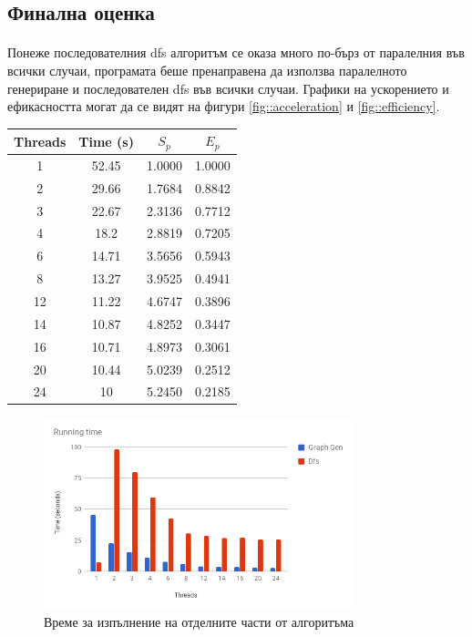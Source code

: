 \subsection*{Финална оценка}

\paragraph*{} Понеже последователния dfs алгоритъм се оказа много по-бърз от паралелния във всички случаи, програмата беше пренаправена да използва паралелното генериране и последователен dfs във всички случаи. Графики на ускорението и ефикасността могат да се видят на фигури \ref{fig::acceleration} и \ref{fig::efficiency}.

\begin{tabular}{|c|c|c|c|}
\hline
Threads & Time (s) & $S_p$ & $E_p$\\
\hline \hline
1 & 52.45 & 1.0000 & 1.0000 \\
\hline
2 & 29.66 & 1.7684 & 0.8842 \\
\hline
3 & 22.67 & 2.3136 & 0.7712 \\
\hline
4 & 18.2 & 2.8819 & 0.7205 \\
\hline
6 & 14.71 & 3.5656 & 0.5943 \\
\hline
8 & 13.27 & 3.9525 & 0.4941 \\
\hline
12 & 11.22 & 4.6747 & 0.3896 \\
\hline
14 & 10.87 & 4.8252 & 0.3447 \\
\hline
16 & 10.71 & 4.8973 & 0.3061 \\
\hline
20 & 10.44 & 5.0239 & 0.2512 \\
\hline
24 & 10 & 5.2450 & 0.2185 \\
\hline
\end{tabular}

\begin{figure}[h]
  \centering
  \includegraphics[width=0.8\textwidth]{resources/running_time.png}
  \caption{\label{fig::running_time} Време за изпълнение на отделните части от алгоритъма}
\end{figure}

